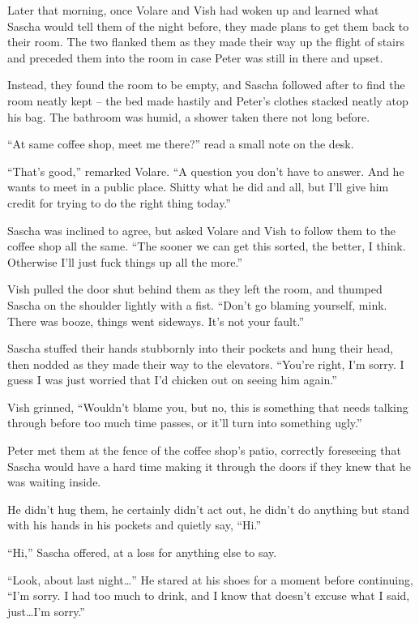 \secdiv

Later that morning, once Volare and Vish had woken up and learned what Sascha would tell them of the night before, they made plans to get them back to their room. The two flanked them as they made their way up the flight of stairs and preceded them into the room in case Peter was still in there and upset.

Instead, they found the room to be empty, and Sascha followed after to find the room neatly kept -- the bed made hastily and Peter's clothes stacked neatly atop his bag. The bathroom was humid, a shower taken there not long before.

``At same coffee shop, meet me there?'' read a small note on the desk.

``That's good,'' remarked Volare. ``A question you don't have to answer. And he wants to meet in a public place. Shitty what he did and all, but I'll give him credit for trying to do the right thing today.''

Sascha was inclined to agree, but asked Volare and Vish to follow them to the coffee shop all the same. ``The sooner we can get this sorted, the better, I think. Otherwise I'll just fuck things up all the more.''

Vish pulled the door shut behind them as they left the room, and thumped Sascha on the shoulder lightly with a fist. ``Don't go blaming yourself, mink. There was booze, things went sideways.  It's not your fault.''

Sascha stuffed their hands stubbornly into their pockets and hung their head, then nodded as they made their way to the elevators. ``You're right, I'm sorry. I guess I was just worried that I'd chicken out on seeing him again.''

Vish grinned, ``Wouldn't blame you, but no, this is something that needs talking through before too much time passes, or it'll turn into something ugly.''

\secdiv

Peter met them at the fence of the coffee shop's patio, correctly foreseeing that Sascha would have a hard time making it through the doors if they knew that he was waiting inside.

He didn't hug them, he certainly didn't act out, he didn't do anything but stand with his hands in his pockets and quietly say, ``Hi.''

``Hi,'' Sascha offered, at a loss for anything else to say.

``Look, about last night\ldots{}'' He stared at his shoes for a moment before continuing, ``I'm sorry. I had too much to drink, and I know that doesn't excuse what I said, just\ldots{}I'm sorry.''

